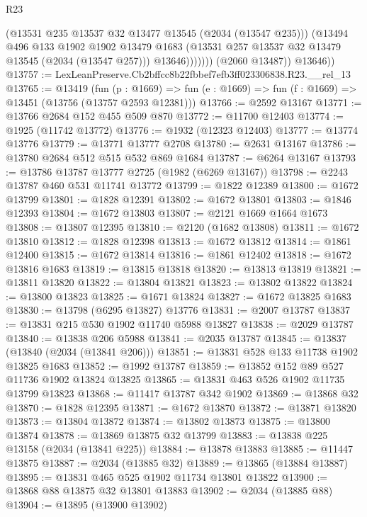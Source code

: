 \begin{lexlean}{R23}
\begin{coremodule}
                      (@13531 @235 @13537 @32 @13477 @13545 (@2034 (@13547 @235)))
                      (@13494
                        @496
                        @133
                        @1902
                        @1902
                        @13479
                        @1683
                        (@13531 @257 @13537 @32 @13479 @13545 (@2034 (@13547 @257)))
                        @13646)))))))
          (@2060 @13487))
        @13646))
@13757 := LexLeanPreserve.Cb2bffcc8b22fbbef7efb3ff023306838.R23.__rel_13
@13765 := @13419
    (fun (p : @1669) => fun (e : @1669) => fun (f : @1669) => @13451 (@13756 (@13757 @2593 @12381)))
@13766 := @2592 @13167
@13771 := @13766 @2684 @152 @455 @509 @870
@13772 := @11700 @12403
@13774 := @1925 (@11742 @13772)
@13776 := @1932 (@12323 @12403)
@13777 := @13774 @13776
@13779 := @13771 @13777 @2708
@13780 := @2631 @13167
@13786 := @13780 @2684 @512 @515 @532 @869 @1684
@13787 := @6264 @13167
@13793 := @13786 @13787 @13777 @2725 (@1982 (@6269 @13167))
@13798 := @2243 @13787 @460 @531 @11741 @13772
@13799 := @1822 @12389
@13800 := @1672 @13799
@13801 := @1828 @12391
@13802 := @1672 @13801
@13803 := @1846 @12393
@13804 := @1672 @13803
@13807 := @2121 @1669 @1664 @1673
@13808 := @13807 @12395
@13810 := @2120 (@1682 @13808)
@13811 := @1672 @13810
@13812 := @1828 @12398
@13813 := @1672 @13812
@13814 := @1861 @12400
@13815 := @1672 @13814
@13816 := @1861 @12402
@13818 := @1672 @13816 @1683
@13819 := @13815 @13818
@13820 := @13813 @13819
@13821 := @13811 @13820
@13822 := @13804 @13821
@13823 := @13802 @13822
@13824 := @13800 @13823
@13825 := @1671 @13824
@13827 := @1672 @13825 @1683
@13830 := @13798 (@6295 @13827) @13776
@13831 := @2007 @13787
@13837 := @13831 @215 @530 @1902 @11740 @5988 @13827
@13838 := @2029 @13787
@13840 := @13838 @206 @5988
@13841 := @2035 @13787
@13845 := @13837 (@13840 (@2034 (@13841 @206)))
@13851 := @13831 @528 @133 @11738 @1902 @13825 @1683
@13852 := @1992 @13787
@13859 := @13852 @152 @89 @527 @11736 @1902 @13824 @13825
@13865 := @13831 @463 @526 @1902 @11735 @13799 @13823
@13868 := @11417 @13787 @342 @1902
@13869 := @13868 @32
@13870 := @1828 @12395
@13871 := @1672 @13870
@13872 := @13871 @13820
@13873 := @13804 @13872
@13874 := @13802 @13873
@13875 := @13800 @13874
@13878 := @13869 @13875 @32 @13799
@13883 := @13838 @225 @13158 (@2034 (@13841 @225))
@13884 := @13878 @13883
@13885 := @11447 @13875
@13887 := @2034 (@13885 @32)
@13889 := @13865 (@13884 @13887)
@13895 := @13831 @465 @525 @1902 @11734 @13801 @13822
@13900 := @13868 @88 @13875 @32 @13801 @13883
@13902 := @2034 (@13885 @88)
@13904 := @13895 (@13900 @13902)

\end{coremodule}
\end{lexlean}
